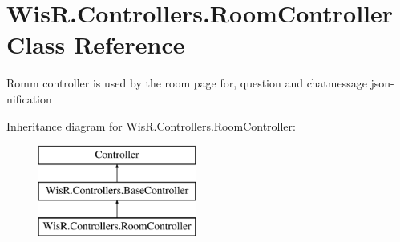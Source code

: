 \hypertarget{class_wis_r_1_1_controllers_1_1_room_controller}{}\section{Wis\+R.\+Controllers.\+Room\+Controller Class Reference}
\label{class_wis_r_1_1_controllers_1_1_room_controller}


Romm controller is used by the room page for, question and chatmessage json-\/nification  


Inheritance diagram for Wis\+R.\+Controllers.\+Room\+Controller\+:\begin{figure}[H]
\begin{center}
\leavevmode
\includegraphics[height=3.000000cm]{class_wis_r_1_1_controllers_1_1_room_controller}
\end{center}
\end{figure}
